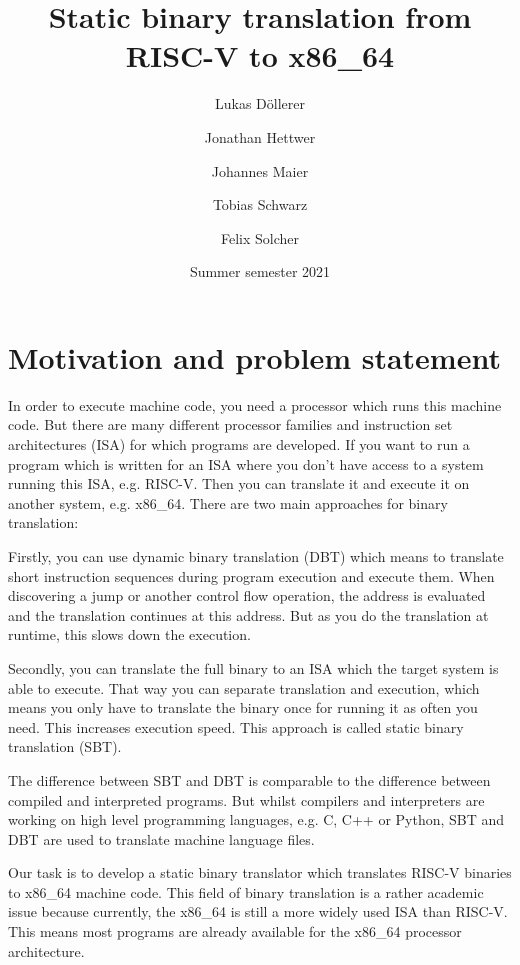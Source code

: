 \documentclass[course=eragp]{aspdoc}
\author{Lukas Döllerer \and Jonathan Hettwer \and Johannes Maier \and Tobias Schwarz \and Felix Solcher}
\date{Summer semester 2021}
\title{Static binary translation from RISC-V to x86\_64}
\begin{document}
\maketitle

\tableofcontents

\pagebreak

\section{Motivation and problem statement}


In order to execute machine code, you need a processor which runs this machine code. But there are
many different processor families and instruction set architectures (ISA) for which programs are
developed. If you want to run a program which is written for an ISA where you don't have access to a
system running this ISA, e.g. RISC-V. Then you can translate it and execute it on another system,
e.g. x86\_64. There are two main approaches for binary translation: \par Firstly, you can use
dynamic binary translation (DBT) which means to translate short instruction sequences during program
execution and execute them. When discovering a jump or another control flow operation, the address
is evaluated and the translation continues at this address. But as you do the translation at
runtime, this slows down the execution. \par Secondly, you can translate the full binary to an ISA
which the target system is able to execute. That way you can separate translation and execution,
which means you only have to translate the binary once for running it as often you need. This
increases execution speed. This approach is called static binary translation (SBT).\par The
difference between SBT and DBT is comparable to the difference between compiled and interpreted
programs. But whilst compilers and interpreters are working on high level programming languages,
e.g. C, C++ or Python, SBT and DBT are used to translate machine language files.\par Our task is to
develop a static binary translator which translates RISC-V binaries to x86\_64 machine code. This
field of binary translation is a rather academic issue because currently, the x86\_64 is still a
more widely used ISA than RISC-V. This means most programs are already available for the x86\_64
processor architecture.
\end{document}
